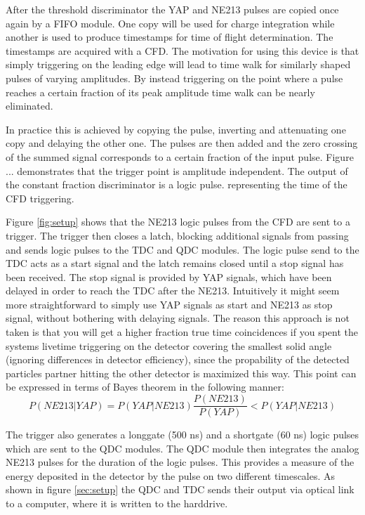 \documentclass[main.tex]{subfiles}
\begin{document}
After the threshold discriminator the YAP and NE213 pulses are copied once again by a FIFO module. One copy will be used for charge integration while another is used to produce timestamps for time of flight determination. The timestamps are acquired with a CFD. The motivation for using this device is that simply triggering on the leading edge will lead to time walk for similarly shaped pulses of varying amplitudes. By instead triggering on the point where a pulse reaches a certain fraction of its peak amplitude time walk can be nearly eliminated\citep[pg.327]{Leo}.

In practice this is achieved by copying the pulse, inverting and attenuating one copy and delaying the other one. The pulses are then added and the zero crossing of the summed signal corresponds to a certain fraction of the input pulse. Figure ... demonstrates that the trigger point is amplitude independent. The output of the constant fraction discriminator is a logic pulse. representing the time of the CFD triggering.

Figure \ref{fig:setup} shows that the NE213 logic pulses from the CFD are sent to a trigger. The trigger then closes a latch, blocking additional signals from passing and sends logic pulses to the TDC and QDC modules. The logic pulse send to the TDC acts as a start signal and the latch remains closed until a stop signal has been received. The stop signal is provided by YAP signals, which have been delayed in order to reach the TDC after the NE213. Intuitively it might seem more straightforward to simply use YAP signals as start and NE213 as stop signal, without bothering with delaying signals. The reason this approach is not taken is that you will get a higher fraction true time coincidences if you spent the systems livetime triggering on the detector covering the smallest solid angle (ignoring differences in detector efficiency), since the propability of the detected particles partner hitting the other detector is maximized this way. This point can be expressed in terms of Bayes theorem in the following manner:
$$P(NE213|YAP) = P(YAP|NE213) \frac{P(NE213)}{P(YAP)} < P(YAP|NE213)$$ 

The trigger also generates a longgate (500 ns) and a shortgate (60 ns) logic pulses which are sent to the QDC modules. The QDC module then integrates the analog NE213 pulses for the duration of the logic pulses. This provides a measure of the energy deposited in the detector by the pulse on two different timescales. As shown in figure \ref{sec:setup} the QDC and TDC sends their output via optical link to a computer, where it is written to the harddrive.
\end{document}
